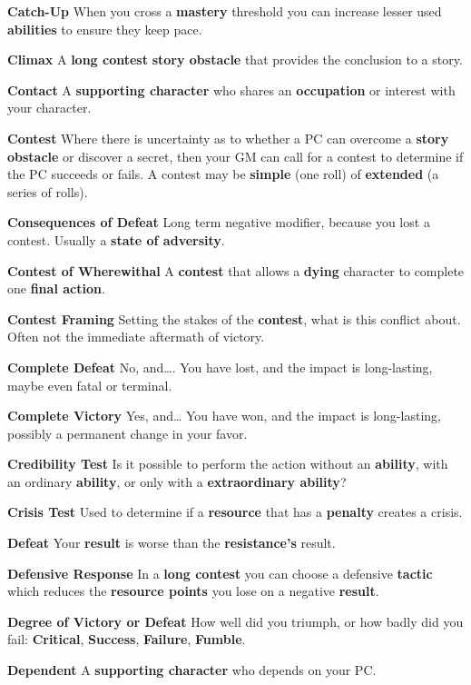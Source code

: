 \documentclass[
]{article}
\begin{document}
\textbf{Catch-Up} When you cross a \textbf{mastery} threshold you can
increase lesser used \textbf{abilities} to ensure they keep pace.

\textbf{Climax} A \textbf{long contest} \textbf{story obstacle} that
provides the conclusion to a story.

\textbf{Contact} A \textbf{supporting character} who shares an
\textbf{occupation} or interest with your character.

\textbf{Contest} Where there is uncertainty as to whether a PC can
overcome a \textbf{story obstacle} or discover a secret, then your GM
can call for a contest to determine if the PC succeeds or fails. A
contest may be \textbf{simple} (one roll) of \textbf{extended} (a series
of rolls).

\textbf{Consequences of Defeat} Long term negative modifier, because you
lost a contest. Usually a \textbf{state of adversity}.

\textbf{Contest of Wherewithal} A \textbf{contest} that allows a
\textbf{dying} character to complete one \textbf{final action}.

\textbf{Contest Framing} Setting the stakes of the \textbf{contest},
what is this conflict about. Often not the immediate aftermath of
victory.

\textbf{Complete Defeat} No, and\ldots. You have lost, and the impact is
long-lasting, maybe even fatal or terminal.

\textbf{Complete Victory} Yes, and\ldots{} You have won, and the impact
is long-lasting, possibly a permanent change in your favor.

\textbf{Credibility Test} Is it possible to perform the action without
an \textbf{ability}, with an ordinary \textbf{ability}, or only with a
\textbf{extraordinary ability}?

\textbf{Crisis Test} Used to determine if a \textbf{resource} that has a
\textbf{penalty} creates a crisis.

\textbf{Defeat} Your \textbf{result} is worse than the
\textbf{resistance's} result.

\textbf{Defensive Response} In a \textbf{long contest} you can choose a
defensive \textbf{tactic} which reduces the \textbf{resource points} you
lose on a negative \textbf{result}.

\textbf{Degree of Victory or Defeat} How well did you triumph, or how
badly did you fail: \textbf{Critical}, \textbf{Success},
\textbf{Failure}, \textbf{Fumble}.

\textbf{Dependent} A \textbf{supporting character} who depends on your
PC.
\end{document}
